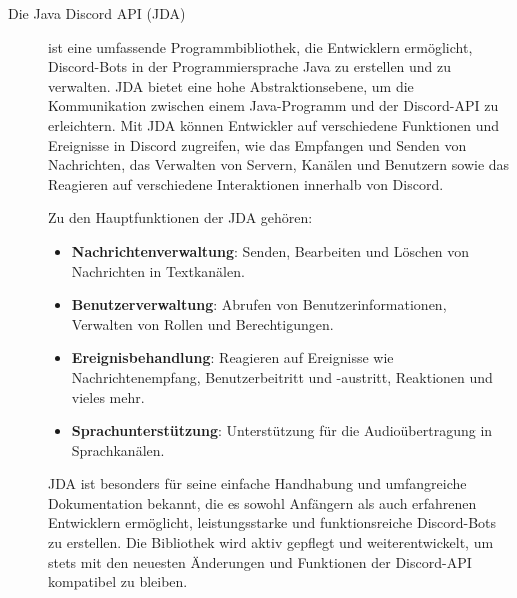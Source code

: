 \begin{description}
 \item[Die Java Discord API (JDA)] ist eine umfassende Programmbibliothek, die Entwicklern ermöglicht, Discord-Bots in der Programmiersprache Java zu erstellen und zu verwalten. JDA bietet eine hohe Abstraktionsebene, um die Kommunikation zwischen einem Java-Programm und der Discord-API zu erleichtern. Mit JDA können Entwickler auf verschiedene Funktionen und Ereignisse in Discord zugreifen, wie das Empfangen und Senden von Nachrichten, das Verwalten von Servern, Kanälen und Benutzern sowie das Reagieren auf verschiedene Interaktionen innerhalb von Discord.
        
        Zu den Hauptfunktionen der JDA gehören:
        \begin{itemize}
            \item \textbf{Nachrichtenverwaltung}: Senden, Bearbeiten und Löschen von Nachrichten in Textkanälen.
            \item \textbf{Benutzerverwaltung}: Abrufen von Benutzerinformationen, Verwalten von Rollen und Berechtigungen.
            \item \textbf{Ereignisbehandlung}: Reagieren auf Ereignisse wie Nachrichtenempfang, Benutzerbeitritt und -austritt, Reaktionen und vieles mehr.
            \item \textbf{Sprachunterstützung}: Unterstützung für die Audioübertragung in Sprachkanälen.
        \end{itemize}
        
        JDA ist besonders für seine einfache Handhabung und umfangreiche Dokumentation bekannt, die es sowohl Anfängern als auch erfahrenen Entwicklern ermöglicht, leistungsstarke und funktionsreiche Discord-Bots zu erstellen. Die Bibliothek wird aktiv gepflegt und weiterentwickelt, um stets mit den neuesten Änderungen und Funktionen der Discord-API kompatibel zu bleiben.
\end{description}
